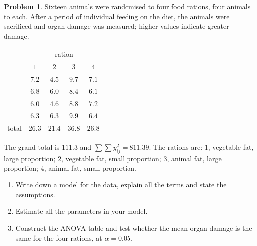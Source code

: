 \documentclass[11pt,a4paper]{article}
\numberwithin{equation}{section}
\theoremstyle{definition}
\newtheorem{problemx}{Problem}[subsection]
\newenvironment{problem}{\begin{problemx}}{\end{problemx}}
\begin{document}
\begin{problem}\label{prob:rations}
Sixteen animals were randomised to four food rations, four animals to each. After a period of individual feeding on the diet, the animals were
sacrificed and organ damage was measured; higher values indicate greater damage.
\begin{center}
\begin{tabular}{c|cccc}
 & \multicolumn{4}{c}{ration} \\
 & $1$ & $2$ & $3$ & $4$ \\
\hline
 & $7.2$ & $4.5$ & $9.7$ & $7.1$ \\
 & $6.8$ & $6.0$ & $8.4$ & $6.1$ \\
 & $6.0$ & $4.6$ & $8.8$ & $7.2$ \\
 & $6.3$ & $6.3$ & $9.9$ & $6.4$ \\
\hline
total & $26.3$ & $21.4$ & $36.8$ & $26.8$
\end{tabular}
\end{center}
The grand total is $111.3$ and $\sum\sum y_{ij}^2 = 811.39$. The rations are: $1$, vegetable fat, large proportion; $2$, vegetable fat, small proportion; $3$, animal
fat, large proportion; $4$, animal fat, small proportion.
\begin{enumerate}[label=(\alph*)]
\item Write down a model for the data, explain all the terms and state the assumptions.
\item Estimate all the parameters in your model.
\item Construct the ANOVA table and test whether the mean organ damage is the same for the four rations, at $\alpha = 0.05$.
\end{enumerate}
\end{problem}
\end{document}
